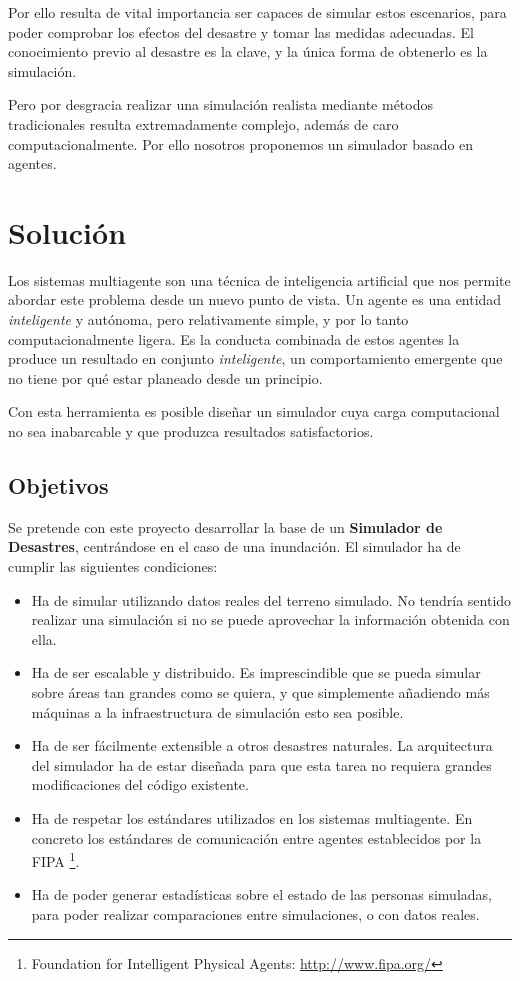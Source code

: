 Por ello resulta de vital importancia ser capaces de simular estos escenarios,
para poder comprobar los efectos del desastre y tomar las medidas adecuadas. El
conocimiento previo al desastre es la clave, y la única forma de obtenerlo es
la simulación.

Pero por desgracia realizar una simulación realista mediante métodos
tradicionales resulta extremadamente complejo, además de caro
computacionalmente. Por ello nosotros proponemos un simulador basado en agentes.

\section*{Solución}

Los sistemas multiagente son una técnica de inteligencia artificial que nos
permite abordar este problema desde un nuevo punto de vista. Un agente es una
entidad {\em inteligente} y autónoma, pero relativamente simple, y por lo tanto
computacionalmente ligera. Es la conducta combinada de estos agentes la produce
un resultado en conjunto {\em inteligente}, un comportamiento emergente que no
tiene por qué estar planeado desde un principio.

Con esta herramienta es posible diseñar un simulador cuya carga computacional
no sea inabarcable y que produzca resultados satisfactorios.

\subsection*{Objetivos}

Se pretende con este proyecto desarrollar la base de un {\bf Simulador de
Desastres}, centrándose en el caso de una inundación. El simulador ha de cumplir
las siguientes condiciones:

\begin{itemize}
 \item Ha de simular utilizando datos reales del terreno simulado. No tendría
sentido realizar una simulación si no se puede aprovechar la información
obtenida con ella.
 \item Ha de ser escalable y distribuido. Es imprescindible que se pueda
simular sobre áreas tan grandes como se quiera, y que simplemente añadiendo más
máquinas a la infraestructura de simulación esto sea posible.
 \item Ha de ser fácilmente extensible a otros desastres naturales. La
arquitectura del simulador ha de estar diseñada para que esta tarea no requiera
grandes modificaciones del código existente.
 \item Ha de respetar los estándares utilizados en los sistemas multiagente. En
concreto los estándares de comunicación entre agentes establecidos por la FIPA
\footnote{Foundation for Intelligent Physical Agents:
\url{http://www.fipa.org/}}.
 \item Ha de poder generar estadísticas sobre el estado de las personas
simuladas, para poder realizar comparaciones entre simulaciones, o con datos
reales.
\end{itemize}

